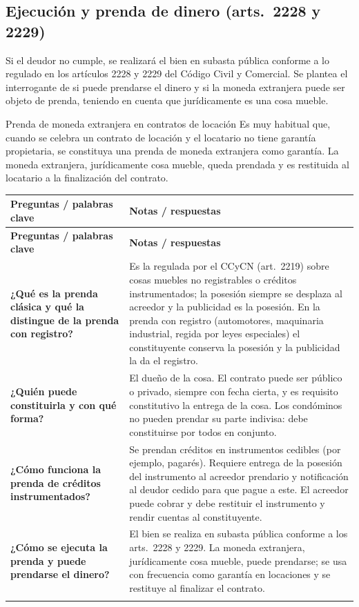 \documentclass[12pt,oneside]{book}
\makeatletter
\renewcommand{\arraystretch}{1.25}
\newcommand{\cq}[2]{\textbf{#1} & #2 \\[0.45em]}
\newcommand{\cornell}[3]{%
\par\bigskip\noindent{\large\bfseries Cuadro Cornell: #1}\par\nopagebreak\smallskip
\begingroup
\small
\renewcommand{\arraystretch}{1.15}
\begin{longtable}{@{}>{\raggedright\arraybackslash}p{0.26\textwidth}>{\raggedright\arraybackslash}p{0.66\textwidth}@{}}
\toprule
\textbf{Preguntas / palabras clave} & \textbf{Notas / respuestas} \\
\midrule
\endfirsthead
\toprule
\textbf{Preguntas / palabras clave} & \textbf{Notas / respuestas} \\
\midrule
\endhead
#2
\midrule
\multicolumn{2}{@{}p{\dimexpr0.92\textwidth+2\tabcolsep\relax}@{}}{\vspace{0.2em}\textbf{Resumen.} #3\vspace{0.2em}} \\
\bottomrule
\end{longtable}
\endgroup
}
\makeatother
\begin{document}
\subsection{Ejecución y prenda de dinero (arts.~2228 y 2229)}

Si el deudor no cumple, se realizará el bien en subasta pública conforme a lo regulado en los artículos 2228 y 2229 del Código Civil y Comercial. Se plantea el interrogante de si puede prendarse el dinero y si la moneda extranjera puede ser objeto de prenda, teniendo en cuenta que jurídicamente es una cosa mueble.

\begin{ejemplo}{Prenda de moneda extranjera en contratos de locación}
Es muy habitual que, cuando se celebra un contrato de locación y el locatario no tiene garantía propietaria, se constituya una prenda de moneda extranjera como garantía. La moneda extranjera, jurídicamente cosa mueble, queda prendada y es restituida al locatario a la finalización del contrato.
\end{ejemplo}

\cornell{prenda}{
\cq{¿Qué es la prenda clásica y qué la distingue de la prenda con registro?}{Es la regulada por el CCyCN (art.~2219) sobre cosas muebles no registrables o créditos instrumentados; la posesión siempre se desplaza al acreedor y la publicidad es la posesión. En la prenda con registro (automotores, maquinaria industrial, regida por leyes especiales) el constituyente conserva la posesión y la publicidad la da el registro.}
\cq{¿Quién puede constituirla y con qué forma?}{El dueño de la cosa. El contrato puede ser público o privado, siempre con fecha cierta, y es requisito constitutivo la entrega de la cosa. Los condóminos no pueden prendar su parte indivisa: debe constituirse por todos en conjunto.}
\cq{¿Cómo funciona la prenda de créditos instrumentados?}{Se prendan créditos en instrumentos cedibles (por ejemplo, pagarés). Requiere entrega de la posesión del instrumento al acreedor prendario y notificación al deudor cedido para que pague a este. El acreedor puede cobrar y debe restituir el instrumento y rendir cuentas al constituyente.}
\cq{¿Cómo se ejecuta la prenda y puede prendarse el dinero?}{El bien se realiza en subasta pública conforme a los arts.~2228 y 2229. La moneda extranjera, jurídicamente cosa mueble, puede prendarse; se usa con frecuencia como garantía en locaciones y se restituye al finalizar el contrato.}
}{La prenda clásica del Código Civil y Comercial recae sobre muebles no registrables o créditos instrumentados, exige siempre la entrega de la posesión al acreedor y no debe confundirse con la prenda con registro, figura especial regulada por leyes separadas en la que el constituyente conserva la posesión.}
\end{document}
